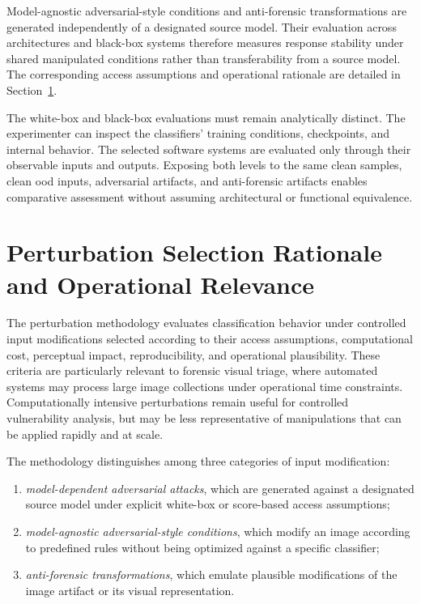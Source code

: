 Model-agnostic adversarial-style conditions and anti-forensic transformations
are generated independently of a designated source model. Their evaluation
across architectures and black-box systems therefore measures response
stability under shared manipulated conditions rather than transferability from
a source model. The corresponding access assumptions and operational rationale
are detailed in
Section~\ref{sec:methodology-perturbation-selection-rationale}.

The white-box and black-box evaluations must remain analytically distinct.
The experimenter can inspect the classifiers' training conditions,
checkpoints, and internal behavior. The selected software systems are evaluated only through
their observable inputs and outputs. Exposing both levels to the same clean
samples, clean \gls{ood} inputs, adversarial artifacts, and anti-forensic
artifacts enables comparative assessment without assuming architectural or
functional equivalence.

\section{Perturbation Selection Rationale and Operational Relevance}
\label{sec:methodology-perturbation-selection-rationale}

The perturbation methodology evaluates classification behavior under controlled
input modifications selected according to their access assumptions,
computational cost, perceptual impact, reproducibility, and operational
plausibility. These criteria are particularly relevant to forensic visual
triage, where automated systems may process large image collections under
operational time constraints. Computationally intensive perturbations remain
useful for controlled vulnerability analysis, but may be less representative
of manipulations that can be applied rapidly and at scale.

The methodology distinguishes among three categories of input modification:

\begin{enumerate}
\item \textit{model-dependent adversarial attacks}, which are generated
against a designated source model under explicit white-box or score-based
access assumptions;

\item \textit{model-agnostic adversarial-style conditions}, which modify an
image according to predefined rules without being optimized against a specific
classifier;

\item \textit{anti-forensic transformations}, which emulate plausible
modifications of the image artifact or its visual representation.
\end{enumerate}

